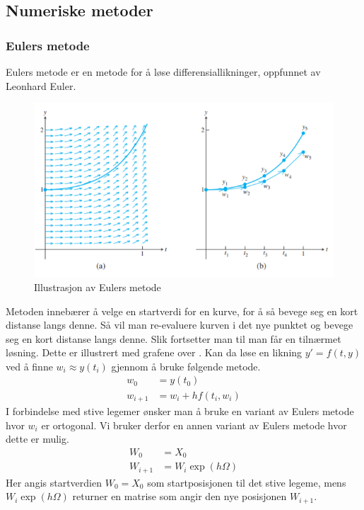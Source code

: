 \graphicspath{ {./bilder/} }
\subsection{Numeriske metoder}
\subsubsection{Eulers metode}
Eulers metode er en metode for å løse differensiallikninger, oppfunnet av Leonhard Euler. \newline
\begin{figure}[!ht]
\begin{center}
\includegraphics{rapport/teori/bilder/eulers.PNG}
\caption{Illustrasjon av Eulers metode}
\label{fig:rotasjon}
\end{center}
\end{figure}\newline\newline
Metoden innebærer å velge en startverdi for en kurve, for å så bevege seg en kort distanse langs denne. Så vil man re-evaluere kurven i det nye punktet og bevege seg en kort distanse langs denne. Slik fortsetter man til man får en tilnærmet løsning. Dette er illustrert med grafene over \cite{MATEMATIKK:1}.\newline\newline
Kan da løse en likning $y' = f(t, y)$ ved å finne $w_i \approx y(t_i)$ gjennom å bruke følgende metode.
\begin{equation}
\begin{aligned}
    w_0&=y(t_0)\\
    w_{i+1}&=w_i + hf(t_i, w_i)
\end{aligned}
\end{equation}
I forbindelse med stive legemer ønsker man å bruke en variant av Eulers metode hvor $w_i$ er ortogonal. Vi bruker derfor en annen variant av Eulers metode hvor dette er mulig.
\begin{equation}
\begin{aligned}
    W_0&=X_0\\
    W_{i+1}&=W_i\exp(h\Omega)
\end{aligned}
\end{equation}
Her angis startverdien $W_0=X_0$ som startposisjonen til det stive legeme, mens $W_i\exp(h\Omega)$ returner en matrise som angir den nye posisjonen $W_{i+1}$.

